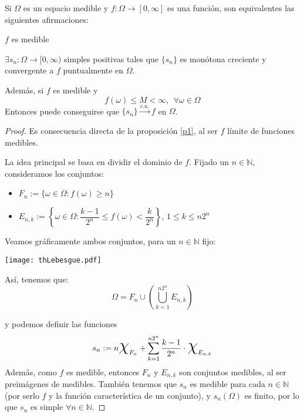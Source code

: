 \begin{nth}
  Si $\Omega$ es un espacio medible y $f:\Omega \to [0,\infty]$ es una función, son equivalentes las siguientes afirmaciones:
  \begin{nlist}
  \item $f$ es medible
  \item $\exists s_n : \Omega \to [0,\infty)$ simples positivas tales que $\{s_n\}$ es monótona creciente y convergente a $f$ puntualmente en $\Omega$.
  \end{nlist}
  Además, si $f$ es medible y
  \[
    f(\omega) \leq M < \infty, \ \ \forall \omega \in \Omega
  \]
  Entonces puede conseguirse que $\{s_n\}\xrightarrow{c.u.}f$ en $\Omega$.
\end{nth}
\begin{proof}\hfill

  Es consecuencia directa de la proposición \ref{p1}, al ser $f$ límite de funciones medibles.

   La idea principal se basa en dividir el dominio de $f$. Fijado un $n \in \mathbb{N}$, consideramos los conjuntos:
    \begin{itemize}
      \item $F_n := \{\omega \in \Omega : f(\omega) \geq n\}$\\
      \item $E_{n,k} := \left\{\omega \in \Omega : \dfrac{k-1}{2^n} \leq f(\omega) < \dfrac{k}{2^n}\right\}$,  $1 \leq k \leq n2^n$\\
    \end{itemize}

  Veamos gráficamente ambos conjuntos, para un $n\in \mathbb{N}$ fijo:
  \begin{center}
	\texttt{[image: thLebesgue.pdf]}
  \end{center}
  Así, tenemos que:
  \[
    \Omega = F_n \cup \left( \bigcup_{k=1}^{n2^n}E_{n,k} \right)
  \]

  y podemos definir las funciones
  \[
    s_n := n\text{\huge {$\chi$}}_{F_n} + \sum_{k=1}^{n2^n}\dfrac{k-1}{2^n}\cdot \text{\huge {$\chi$}}_{E_{n,k}}
  \]
  Además, como $f$ es medible, entonces $F_n$ y $E_{n,k}$ son conjuntos medibles, al ser preimágenes de medibles. También tenemos que $s_n$ es medible para cada $n \in \mathbb{N}$ (por serlo $f$ y la función característica de un conjunto), y $s_n(\Omega)$ es finito, por lo que $s_n$ es simple $\forall n \in \mathbb{N}$.


\end{proof}
